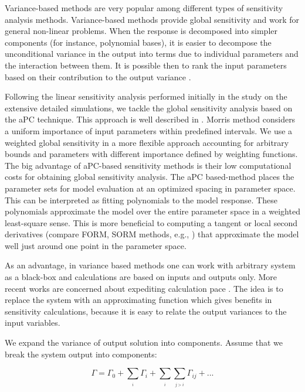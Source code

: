 Variance-based methods are very popular among different types of sensitivity
analysis methods. Variance-based methods provide global sensitivity and work
for general non-linear problems. When the response is decomposed into simpler
components (for instance, polynomial bases), it is easier to decompose the
unconditional variance in the output into terms due to individual parameters
and the interaction between them. It is possible then to rank the input
parameters based on their contribution to the output variance
\cite{saltelli2007global,reuter2008global}.

Following the linear sensitivity analysis performed initially in the study on
the extensive detailed simulations, we tackle the global sensitivity analysis
based on the aPC technique. This approach is well described in
\cite{oladyshkin2011concept,
OladNowakBarros_AWR2011}. Morris method \cite{Morris1991} considers a uniform
importance of input parameters within predefined intervals. We use a weighted
global sensitivity in a more flexible approach accounting for arbitrary bounds
and parameters with different importance defined by weighting functions. The
big advantage of aPC-based sensitivity methods is their low computational costs
for obtaining global sensitivity analysis. The aPC based-method
places the parameter sets for model evaluation at an optimized spacing in
parameter space. This can be interpreted as fitting polynomials to the model
response. These polynomials approximate the model over the entire parameter
space in a weighted least-square sense. This is more beneficial to computing a
tangent or local second derivatives (compare FORM, SORM methods, e.g.,
\cite{Jang1994}) that approximate the model well just around one point in the
parameter space.
 
As an advantage, in variance based methods one can work with arbitrary system as
a black-box and calculations are based on inputs and outputs only. More
recent works are concerned about expediting calculation pace
\cite{crestaux2009polynomial,oladyshkin2011concept, OladNowakBarros_AWR2011}.
The idea is to replace the system with an approximating function which gives
benefits in sensitivity calculations, because it is easy to relate the output
variances to
the input variables. 

We expand the variance of output solution into
components. Assume that we break the system output into components:

\begin{equation}
\Gamma=\Gamma_{0}+\underset{_{i}}{\sum}\Gamma_{i}+\underset{_{i}}{\sum}\underset
{_{j>i}}{\sum}\Gamma_{ij}+...\label{eq:comp}\end{equation}

